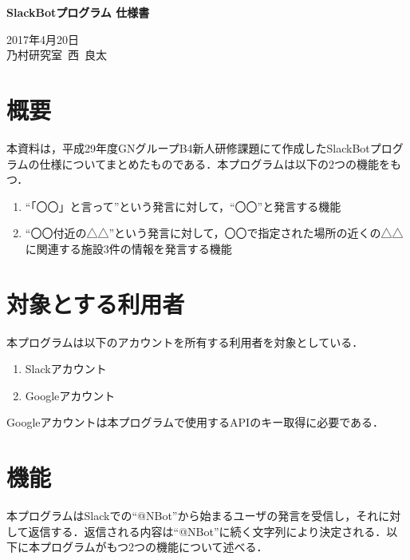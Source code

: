\documentclass[fleqn, 14pt]{extarticlej}
\begin{document}
\begin{center}
{\Large {\bf SlackBotプログラム 仕様書}}

\end{center}

\begin{flushright}
  2017年4月20日\\
  
  乃村研究室\ 西\ 良太
\end{flushright}

\section{概要}
本資料は，平成29年度GNグループB4新人研修課題にて作成したSlackBotプログラムの仕様についてまとめたものである．本プログラムは以下の2つの機能をもつ．

\begin{enumerate}
\item ``「〇〇」と言って''という発言に対して，``〇〇''と発言する機能
\item ``〇〇付近の△△''という発言に対して，〇〇で指定された場所の近くの△△に関連する施設3件の情報を発言する機能
\end{enumerate}

\section{対象とする利用者}
本プログラムは以下のアカウントを所有する利用者を対象としている．

\begin{enumerate}
\item Slackアカウント
\item Googleアカウント
\end{enumerate}

Googleアカウントは本プログラムで使用するAPIのキー取得に必要である．

\section{機能}
本プログラムはSlackでの``@NBot''から始まるユーザの発言を受信し，それに対して返信する．返信される内容は``@NBot''に続く文字列により決定される．以下に本プログラムがもつ2つの機能について述べる．
\end{document}
